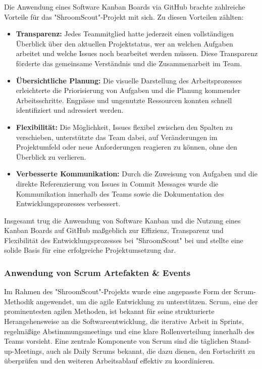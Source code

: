 \documentclass[../main.tex]{subfiles}
\begin{document}
Die Anwendung eines Software Kanban Boards via GitHub brachte zahlreiche Vorteile für das "ShroomScout"-Projekt mit sich. Zu diesen Vorteilen zählten:

\begin{itemize}

  \item \textbf{Transparenz:}
  Jedes Teammitglied hatte jederzeit einen vollständigen Überblick über den aktuellen Projektstatus, wer an welchen Aufgaben arbeitet und welche 
  Issues noch bearbeitet werden müssen. Diese Transparenz förderte das gemeinsame Verständnis und die Zusammenarbeit im Team.

  \item \textbf{Übersichtliche Planung:}
  Die visuelle Darstellung des Arbeitsprozesses erleichterte die Priorisierung von Aufgaben und die Planung kommender Arbeitsschritte. 
  Engpässe und ungenutzte Ressourcen konnten schnell identifiziert und adressiert werden.

  \item \textbf{Flexibilität:}
  Die Möglichkeit, Issues flexibel zwischen den Spalten zu verschieben, unterstützte das Team dabei, auf Veränderungen im Projektumfeld oder neue 
  Anforderungen reagieren zu können, ohne den Überblick zu verlieren.

  \item \textbf{Verbesserte Kommunikation:} 
  Durch die Zuweisung von Aufgaben und die direkte Referenzierung von Issues in Commit Messages wurde die Kommunikation innerhalb 
  des Teams sowie die Dokumentation des Entwicklungsprozesses verbessert.

\end{itemize}

Insgesamt trug die Anwendung von Software Kanban und die Nutzung eines Kanban Boards auf GitHub maßgeblich zur Effizienz, Transparenz und Flexibilität des 
Entwicklungsprozesses bei "ShroomScout" bei und stellte eine solide Basis für eine erfolgreiche Projektumsetzung dar.

\subsubsection{Anwendung von Scrum Artefakten \& Events}
Im Rahmen des "ShroomScout"-Projekts wurde eine angepasste Form der Scrum-Methodik angewendet, um die agile Entwicklung zu unterstützen. Scrum, eine der 
prominentesten agilen Methoden, ist bekannt für seine strukturierte Herangehensweise an die Softwareentwicklung, die iterative Arbeit in Sprints, regelmäßige 
Abstimmungsmeetings und eine klare Rollenverteilung innerhalb des Teams vorsieht. Eine zentrale Komponente von Scrum sind die täglichen Stand-up-Meetings, auch 
als Daily Scrums bekannt, die dazu dienen, den Fortschritt zu überprüfen und den weiteren Arbeitsablauf effektiv zu koordinieren.
\end{document}
